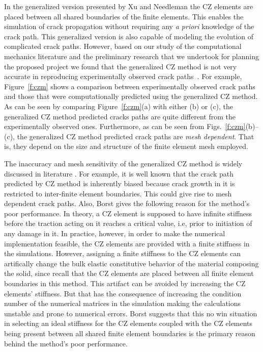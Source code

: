 \documentclass[10pt,letterpaper]{article}
\begin{document}
    In the generalized version presented by Xu and Needleman the CZ elements are placed between all shared boundaries of the finite elements. This enables the simulation of crack propagation without requiring any \textit{a priori} knowledge of the crack path. This  generalized version is also capable of modeling the evolution of complicated crack paths. However, based on our study of the computational mechanics literature and the preliminary research that we undertook for planning the proposed project we found that the  generalized  CZ method is not very accurate in reproducing experimentally observed crack paths~\cite{tijssens2000numerical,de2003numerical,de2004computational}. For example,  Figure~\ref{f:czm} shows a comparison between  experimentally observed crack paths and those that were computationally predicted using the generalized CZ method. As can be seen by comparing Figure~\ref{f:czm}(a) with either (b) or (c),  the generalized CZ method predicted cracks paths are quite different from the experimentally observed ones.  Furthermore, as can be seen from Figs.~\ref{f:czm}(b)--(c), the generalized CZ method predicted crack paths are \textit{mesh dependent}. That is, they depend on the size and structure of the finite element mesh employed.

    The inaccuracy and  mesh sensitivity of the generalized CZ method is widely discussed in literature \cite{de2003numerical,de2004computational,tijssens2000numerical,song2008comparative}. For example, it is well known that  the crack path predicted by CZ method is inherently biased because crack growth in it is restricted to inter-finite element boundaries. This could give rise to mesh dependent crack paths. Also, Borst \cite{de2003numerical,de2004computational} gives the following reason for the method's poor performance. In theory, a CZ element is supposed to have infinite stiffness before the traction acting on it reaches a critical value, i.e, prior to initiation of any damage in it. In practice, however, in order to make the numerical implementation feasible, the CZ elements are provided with a finite stiffness  in the simulations. However, assigning a finite stiffness to the CZ elements can artifically change the bulk elastic constitutive behavior of the material composing the solid, since recall that the CZ elements are placed between all finite element boundaries in this method. This artifact can be avoided by increasing the CZ elements' stiffness. But that has the consequence of increasing the condition number of the numerical matrices in the simulation making the calculations unstable and prone to numerical errors. Borst suggests that this no win situation in selecting an ideal stiffness for the CZ elements coupled with the CZ elements being present between all shared finite element boundaries is the primary reason behind the method's poor performance.
\end{document}
